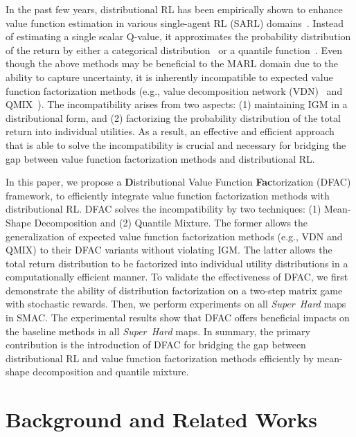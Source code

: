 \documentclass{article}
\newcommand{\superhard}{\textit{Super~Hard}}
\begin{document}
In the past few years, distributional RL has been empirically shown to enhance value function estimation in various single-agent RL (SARL) domains~\cite{Bellemare2017C51,Dabney2018QR-DQN,Dabney2018IQN,Rowland2019ER-DQN,Yang2019FQF}. Instead of estimating a single scalar Q-value, it approximates the probability distribution of the return by either a categorical distribution~\cite{Bellemare2017C51} or a quantile function~\cite{Dabney2018QR-DQN,Dabney2018IQN}. Even though the above methods may be beneficial to the MARL domain due to the ability to capture uncertainty, it is inherently incompatible to expected value function factorization methods (e.g., value decomposition network (VDN)~\cite{Sunehag2018VDN} and QMIX~\cite{Rashid2018QMIX}). The incompatibility arises from two aspects: (1) maintaining IGM in a distributional form, and (2) factorizing the probability distribution of the total return into individual utilities. As a result, an effective and efficient approach that is able to solve the incompatibility is crucial and necessary for bridging the gap between value function factorization methods and distributional RL.



In this paper, we propose a \textbf{D}istributional Value Function \textbf{Fac}torization (DFAC) framework, to efficiently integrate value function factorization methods with distributional RL.
DFAC solves the incompatibility by two techniques: (1) Mean-Shape Decomposition and (2) Quantile Mixture. The former allows the generalization of expected value function factorization methods (e.g., VDN and QMIX) to their DFAC variants without violating IGM. The latter allows the total return distribution to be factorized into individual utility distributions in a computationally efficient manner.
To validate the effectiveness of DFAC, we first demonstrate the ability of distribution factorization on a two-step matrix game with stochastic rewards. Then, we perform experiments on all \superhard{} maps in SMAC. The experimental results show that DFAC offers beneficial impacts on the baseline methods in all \superhard{} maps. In summary, the primary contribution is the introduction of DFAC for bridging the gap between distributional RL and value function factorization methods efficiently by mean-shape decomposition and quantile mixture.
 \section{Background and Related Works}
\label{sec:background}
\end{document}
